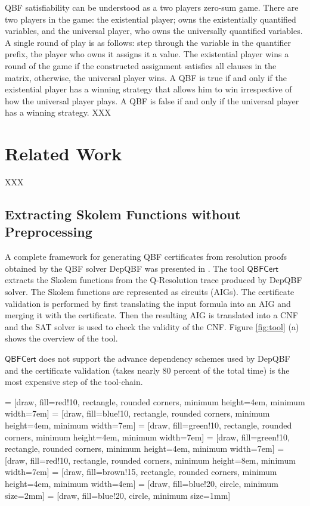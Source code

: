 \documentclass[runningheads]{llncs}
\newcommand{\qrpcert}{\mathsf{QBFCert}}
\newcommand{\0}{0}
\newcommand{\1}{1}
\begin{document}
QBF satisfiability can be understood as a two players zero-sum game. There are two players in the game: the existential player; owns the existentially quantified variables, and the universal player, who owns the universally quantified variables. A single round of play is as follows: step through the variable in the quantifier prefix, the player who owns it assigns it a value. The existential player wins a round of the game if the constructed assignment satisfies all clauses in the matrix, otherwise, the universal player wins. A QBF is true if and only if the existential player has a winning strategy that allows him to win irrespective of how the universal player plays. A QBF is false if and only if the universal player has a winning strategy. 
XXX
\section{Related Work} \label{sec:related-work}
XXX
\subsection{Extracting Skolem Functions without Preprocessing} \label{subsec:skolem-nopre}
A complete framework for generating QBF certificates from resolution proofs obtained by the QBF solver DepQBF was presented in \cite{NiemetzPLSB12}. The tool $\qrpcert$ extracts the Skolem functions \cite{BalabanovJ11} from the Q-Resolution trace produced by DepQBF solver. The Skolem functions are represented as circuits (AIGs). The certificate validation is performed by first translating the input formula into an AIG  and merging it with the certificate. Then the resulting AIG is translated into a CNF and the SAT solver is used to check the validity of the CNF. Figure \ref{fig:tool} (a) shows the overview of the tool. 

$\qrpcert$ does not support the advance dependency schemes used by DepQBF and the certificate validation (takes nearly 80 percent of the total time) is the most expensive step of the tool-chain.  
 
 = [draw, fill=red!10, rectangle, rounded corners,
minimum height=4em, minimum width=7em]
 = [draw, fill=blue!10, rectangle, rounded corners,
minimum height=4em, minimum width=7em]
 = [draw, fill=green!10, rectangle, rounded corners,
minimum height=4em, minimum width=7em]
 = [draw, fill=green!10, rectangle, rounded corners,
minimum height=4em, minimum width=7em]
 = [draw, fill=red!10, rectangle, rounded corners,
minimum height=8em, minimum width=7em]
 = [draw, fill=brown!15, rectangle, rounded corners,
minimum height=4em, minimum width=4em]
 = [draw, fill=blue!20, circle, minimum size=2mm]
 = [draw, fill=blue!20, circle, minimum size=1mm]
\end{document}
